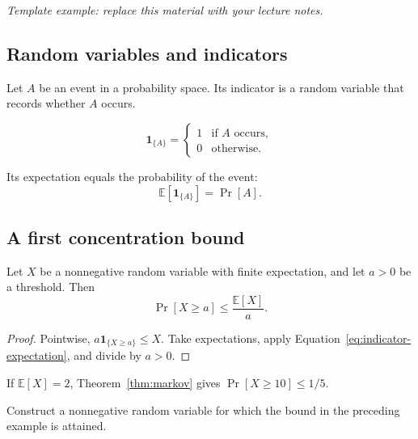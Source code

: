 \label{lec:probability}

\noindent\emph{Template example: replace this material with your lecture notes.}

\subsection{Random variables and indicators}

Let $A$ be an event in a probability space. Its indicator is a random variable
that records whether $A$ occurs.
\begin{definition}[Indicator]
\label{def:indicator}
\[
    \mathbf{1}_{\{A\}} =
    \begin{cases}
        1 & \text{if $A$ occurs},\\
        0 & \text{otherwise}.
    \end{cases}
\]
\end{definition}
Its expectation equals the probability of the event:
\begin{equation}
    \mathbb{E}\left[\mathbf{1}_{\{A\}}\right] = \Pr[A].
    \label{eq:indicator-expectation}
\end{equation}

\subsection{A first concentration bound}

\begin{theorem}
\label{thm:markov}
Let $X$ be a nonnegative random variable with finite expectation, and let $a>0$
be a threshold. Then
\begin{equation}
    \Pr[X\geq a] \leq \frac{\mathbb{E}[X]}{a}.
    \label{eq:markov}
\end{equation}
\end{theorem}
\begin{proof}
Pointwise, $a\mathbf{1}_{\{X\geq a\}}\leq X$. Take expectations, apply
Equation~\eqref{eq:indicator-expectation}, and divide by $a>0$.
\end{proof}

\begin{example}
If $\mathbb{E}[X]=2$, Theorem~\ref{thm:markov} gives $\Pr[X\geq 10]\leq 1/5$.
\end{example}
\begin{exercise}
Construct a nonnegative random variable for which the bound in the preceding
example is attained.
\end{exercise}


